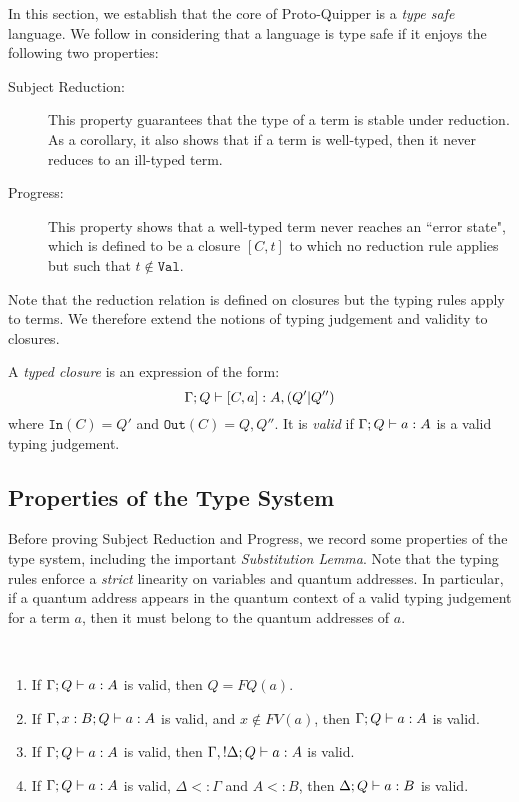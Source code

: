 \documentclass{article}
\begin{document}
In this section, we establish that the core of  Proto-Quipper 
is a \emph{type safe} language. We follow \cite{WrFe94} in 
considering that a language is type safe if it enjoys the 
following two properties: 
\begin{description}
  \item[Subject Reduction:] This property guarantees 
  that the type of a term is stable under reduction.
  As a corollary, it also shows that if a term is 
  well-typed, then it never reduces to an ill-typed 
  term.
  \item[Progress:] This property shows that a 
  well-typed term never reaches an ``error state", 
  which is defined to be a closure $[C,t]$ to which 
  no reduction rule applies but such that 
  $t\notin \mathtt{Val}$. 
\end{description}
Note that the reduction relation is defined on closures 
but the typing rules apply to terms. We therefore extend 
the notions of typing judgement and validity to closures.

\begin{definition}
A \emph{typed closure} is an expression of the form:
\[
\Gamma;Q\vdash [C,a]:A,(Q'|Q'')
\]
where $\mathtt{In}(C)=Q'$ and $\mathtt{Out}(C)=Q,Q''$. 
It is \emph{valid} if $\Gamma;Q\vdash a:A$ is a valid 
typing judgement.
\end{definition}

\subsection{Properties of the Type System}

Before proving Subject Reduction and Progress, we record 
some properties of the type system, including the important 
\emph{Substitution Lemma}. Note that the typing rules 
enforce a \emph{strict} linearity on variables and quantum 
addresses. In particular, if a quantum address appears in 
the quantum context of a valid typing judgement for a term 
$a$, then it must belong to the quantum addresses of $a$.

\begin{lemma}~
\label{prop_type_syst}
\begin{enumerate}
  \item If $\Gamma; Q \vdash a:A$ is valid, 
  then $Q=FQ(a)$.\label{q_context}
  \item If $\Gamma,x:B;Q \vdash a:A$ is valid, 
  and $x\notin FV(a)$, then $\Gamma;Q \vdash a:A$ is valid.\label{unused_var}
  \item If $\Gamma; Q \vdash a:A$ is valid, 
  then $\Gamma, !\Delta ; Q \vdash a:A$ is valid.\label{weakening}
  \item If $\Gamma ; Q \vdash a:A$ is valid, $\Delta <: \Gamma$
  and $A<:B$, then $\Delta ; Q \vdash a:B$ is valid.\label{subtype}
\end{enumerate}
\end{lemma}
\end{document}
